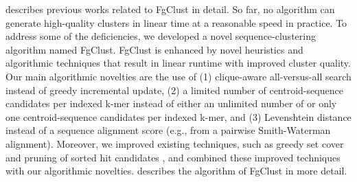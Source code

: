 \documentclass{bioinfo}
\begin{document}
 describes previous works related to FgClust in detail.
So far, no algorithm can generate high-quality clusters in linear time at a reasonable speed in practice.
To address some of the deficiencies,  we developed a novel sequence-clustering algorithm named FgClust.
FgClust is enhanced by novel heuristics and algorithmic techniques that result in linear runtime with improved cluster quality.
Our main algorithmic novelties are the use of 
(1) clique-aware all-versus-all search instead of greedy incremental update, 
(2) a limited number of centroid-sequence candidates per indexed k-mer instead of either an unlimited number of or only one centroid-sequence candidates per indexed k-mer, and
(3) Levenshtein distance instead of a sequence alignment score (e.g., from a pairwise Smith-Waterman alignment). 
Moreover, we improved existing techniques, such as greedy set cover \citep{steinegger2017mmseqs2} and pruning of sorted hit candidates \citep{edgar2010search}, and combined these improved techniques with our algorithmic novelties.
 describes the algorithm of FgClust in more detail.



%

%
%
%
%
%
%
%
%
%
%
%
\end{document}
